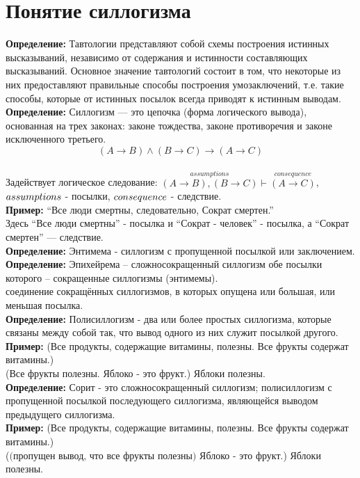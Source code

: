 \documentclass[../main.tex]{subfiles}
\begin{document}
\section{Понятие силлогизма}
\textbf{Определение:
}Тавтологии представляют собой схемы построения истинных высказываний, независимо от содержания и истинности составляющих высказываний. Основное значение тавтологий состоит в том, что некоторые из них предоставляют правильные способы построения умозаключений, т.е. такие способы, которые от истинных посылок всегда приводят к истинным выводам. \\
\textbf{Определение:
} Силлогизм — это цепочка (форма логического вывода), основанная на трех законах: законе тождества, законе противоречия и законе исключенного третьего. \[(A \rightarrow B) \land (B \rightarrow C) \to {(A \rightarrow C)}\]\\
Задействует логическое следование: $\stackrel{assumptions}{(A \rightarrow B), (B \rightarrow C)} \vdash \stackrel{consequence}{(A \rightarrow C)}$, 
$\small assumptions$ - посылки, $\small consequence$ - следствие. \\
\textbf{Пример:
}``Все люди смертны, следовательно, Сократ смертен.'' \\
Здесь ``Все люди смертны'' - посылка и ``Сократ - человек'' - посылка, а ``Сократ смертен'' — следствие.\\
\textbf{
    Определение:
} Энтимема - силлогизм с пропущенной посылкой или заключением. \\
\textbf{
	Определение:
} Эпихейрема – сложносокращенный силлогизм обе посылки которого – сокращенные силлогизмы (энтимемы). \\
соединение сокращённых силлогизмов, в которых опущена или большая, или меньшая посылка. \\
\textbf{
	Определение:
} Полисиллогизм - два или более простых силлогизма, которые связаны между собой так, что вывод одного из них служит посылкой другого. \\
\textbf{
	Пример:
}(Все продукты, содержащие витамины, полезны. Все фрукты содержат витамины.) \\
(Все фрукты полезны. Яблоко - это фрукт.)
Яблоки полезны. \\
\textbf{
	Определение:
} Сорит - это сложносокращенный силлогизм; полисиллогизм с пропущенной посылкой последующего силлогизма, являющейся
выводом предыдущего силлогизма. \\
\textbf{
	Пример:
} (Все продукты, содержащие витамины, полезны. Все фрукты содержат витамины.) \\
($\textit{(пропущен вывод, что все фрукты полезны)}$ Яблоко - это фрукт.)
Яблоки полезны.
\end{document}
